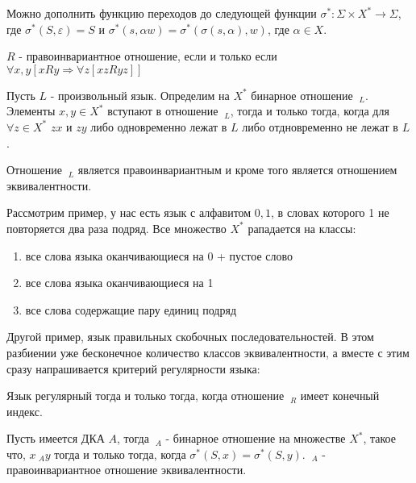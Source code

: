 Можно дополнить функцию переходов до следующей функции $\sigma^* : \Sigma\times X^* \rightarrow \Sigma$, где $\sigma^*\left(S,\varepsilon\right) = S$ и
$\sigma^*\left(s, \alpha w\right) = \sigma^*\left(\sigma\left(s,\alpha\right),w\right)$, где $\alpha \in X$.

\begin{Def}
$R$ - правоинвариантное отношение, если и только если $\forall x,y \left[x R y \Rightarrow \forall z \left[xz R yz\right]\right]$
\end{Def}

Пусть $L$ - произвольный язык. Определим на $X^*$ бинарное отношение $~_L$. Элементы $x,y \in X^*$ вступают в отношение $~_L$, тогда и только тогда, когда для
$\forall z\in X^*$ $zx$ и $zy$ либо одновременно лежат в $L$ либо отдновременно не лежат в $L$.

Отношение $~_L$ является правоинвариантным и кроме того является отношением эквивалентности.

Рассмотрим пример, у нас есть язык с алфавитом ${0,1}$, в словах которого 1 не повторяется два раза подряд. Все множество $X^*$ рападается на классы:
\begin{enumerate}
\item все слова языка оканчивающиеся на 0 + пустое слово

\item все слова языка оканчивающиеся на 1

\item все слова содержащие пару единиц подряд
\end{enumerate}

Другой пример, язык правильных скобочных последовательностей. В этом разбиении уже бесконечное количество классов эквивалентности, а вместе с этим сразу
напрашивается критерий регулярности языка:

\begin{Th}
Язык регулярный тогда и только тогда, когда отношение $~_R$ имеет конечный индекс.
\end{Th}

\begin{Def}
Пусть имеется ДКА $A$, тогда $~_A$ - бинарное отношение на множестве $X^*$, такое что, $x~_Ay$ тогда и только тогда, когда
$\sigma^*\left(S,x\right) = \sigma^*\left(S,y\right)$. $~_A$ - правоинвариантное отношение эквивалентности.
\end{Def}

